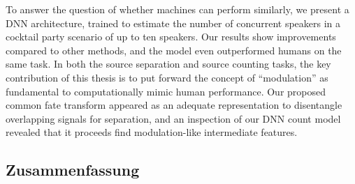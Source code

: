 To answer the question of whether machines can perform similarly, we present a DNN architecture, trained to estimate the number of concurrent speakers in a cocktail party scenario of up to ten speakers. 
Our results show improvements compared to other methods, and the model even outperformed humans on the same task.
In both the source separation and source counting tasks, the key contribution of this thesis is to put forward the concept of ``modulation'' as fundamental to computationally mimic human performance. 
Our proposed common fate transform appeared as an adequate representation to disentangle overlapping signals for separation, and an inspection of our DNN count model revealed that it proceeds find modulation-like intermediate features.
\vfill

\begin{otherlanguage}{ngerman}
\chapter*{Zusammenfassung}


\end{otherlanguage}
